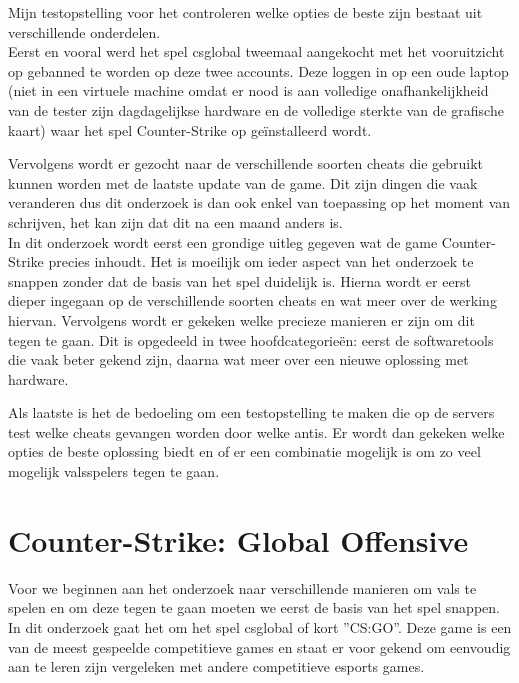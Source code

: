 \documentclass[pdftex,a4paper,12pt,twoside]{report}
\begin{document}
Mijn testopstelling voor het controleren welke opties de beste zijn bestaat uit verschillende onderdelen. 
\\

Eerst en vooral werd het spel \gls{csglobal} tweemaal aangekocht met het vooruitzicht op gebanned te worden op deze twee accounts. Deze loggen in op een oude laptop (niet in een virtuele machine omdat er nood is aan volledige onafhankelijkheid van de tester zijn dagdagelijkse hardware en de volledige sterkte van de grafische kaart) waar het spel Counter-Strike op geïnstalleerd wordt. 

Vervolgens wordt er gezocht naar de verschillende soorten \gls{cheat}s die gebruikt kunnen worden met de laatste update van de game. Dit zijn dingen die vaak veranderen dus dit onderzoek is dan ook enkel van toepassing op het moment van schrijven, het kan zijn dat dit na een maand anders is.
\\

In dit onderzoek wordt eerst een grondige uitleg gegeven wat de game Counter-Strike precies inhoudt. Het is moeilijk om ieder aspect van het onderzoek te snappen zonder dat de basis van het spel duidelijk is. Hierna wordt er eerst dieper ingegaan op de verschillende soorten \gls{cheat}s en wat meer over de werking hiervan. Vervolgens wordt er gekeken welke precieze manieren er zijn om dit tegen te gaan. Dit is opgedeeld in twee hoofdcategorieën: eerst de softwaretools die vaak beter gekend zijn, daarna wat meer over een nieuwe oplossing met hardware. 

\newpage
Als laatste is het de bedoeling om een testopstelling te maken die op de servers test welke \gls{cheat}s gevangen worden door welke \gls{anti}s. Er wordt dan gekeken welke opties de beste oplossing biedt en of er een combinatie mogelijk is om zo veel mogelijk valsspelers tegen te gaan. 


\chapter{Counter-Strike: Global Offensive}
\label{ch:csgo}
Voor we beginnen aan het onderzoek naar verschillende manieren om vals te spelen en om deze tegen te gaan moeten we eerst de basis van het spel snappen. In dit onderzoek gaat het om het spel \gls{csglobal} of kort ''CS:GO''. Deze game is een van de meest gespeelde competitieve games en staat er voor gekend om eenvoudig aan te leren zijn vergeleken met andere competitieve \gls{esports} games. 
\\
\end{document}
